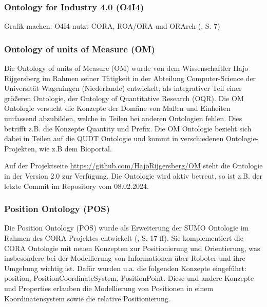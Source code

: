 \documentclass{article}
\begin{document}
\subsubsection{Ontology for Industry 4.0 (O4I4)}

\cite{kumar2019ontologies}

Grafik machen: O4I4 nutzt CORA, ROA/ORA und ORArch (\cite{kumar2019ontologies}, S. 7)

\subsubsection{Ontology of units of Measure (OM)}

Die Ontology of units of Measure (OM) wurde von dem Wissenschaftler Hajo Rijgersberg im Rahmen seiner Tätigkeit in der Abteilung Computer-Science der Universität Wageningen (Niederlande) entwickelt, als integrativer Teil einer größeren Ontologie\cite{rijgersberg2013ontology}, der Ontology of Quantitative Research (OQR).
Die OM Ontologie versucht die Konzepte der Domäne von Maßen und Einheiten umfassend abzubilden, welche in Teilen bei anderen Ontologien fehlen. Dies betrifft z.B. die Konzepte Quantity und Prefix. Die OM Ontologie bezieht sich dabei in Teilen auf die QUDT Ontologie und kommt in verschiedenen Ontologie-Projekten, wie z.B dem Bioportal\cite{OM_BioPortal}.

Auf der Projektseite \url{https://github.com/HajoRijgersberg/OM} steht die Ontologie in der Version 2.0 zur Verfügung. Die Ontologie wird aktiv betreut, so ist z.B. der letzte Commit im Repository vom 08.02.2024.

\subsubsection{Position Ontology (POS)}


Die Position Ontology (POS) wurde als Erweiterung der SUMO Ontologie im Rahmen des CORA Projektes entwickelt (\cite{fiorini2015extensions}, S. 17 ff).
Sie komplementiert die CORA Ontologie mit neuen Konzepten zur Positionierung und Orientierung, was insbesondere bei der Modellierung von Informationen über Roboter und ihre Umgebung wichtig ist.
Dafür wurden u.a. die folgenden Konzepte eingeführt: position, PositionCoordinateSystem, PositionPoint.
Diese und andere Konzepte und Properties erlauben die Modellierung von Positionen in einem Koordinatensystem sowie die relative Positionierung.
\end{document}
